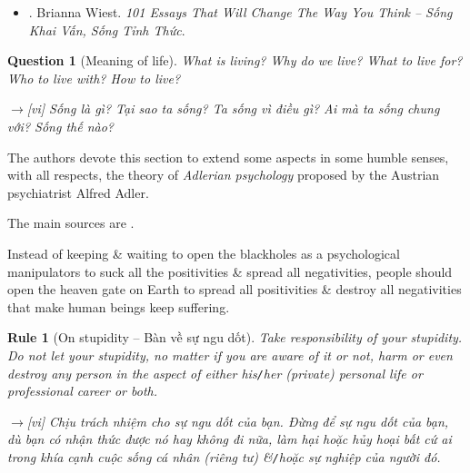 \documentclass[12pt,twoside]{book}
\newtheorem{question}{Question}
\newtheorem{Rule}{Rule}
\begin{document}
\begin{itemize}
\begin{itemize}
		{\sf[en]$\to$[vi]} Hoàn thành các mục tiêu không phải là thành công. Mà việc bạn mở rộng bao nhiêu trong quá trình này mới là thành công.
		
		\item {\it``Your habits create your mood, \& your mood is a filter through which you experience your life.''}
		
		{\sf[en]$\to$[vi]} Thói quen của bạn tạo ra tâm trạng của bạn, \& tâm trạng của bạn là một bộ lọc để bạn trải nghiệm cuộc sống của mình.
		
		\item {\it``You must learn to let your conscious decisions dictate your day -- not your fears or impulses.''}
		
		{\sf[en]$\to$[vi]} Bạn phải học cách để những quyết định có ý thức quyết định ngày của bạn -- chứ không phải nỗi sợ hãi hay sự bốc đồng của bạn
	\end{itemize}	
	Với bản dịch tiếng Việt:
	\item \cite{Wiest_101_essays_VN}. {\sc Brianna Wiest}. {\it 101 Essays That Will Change The Way You Think -- Sống Khai Vấn, Sống Tỉnh Thức}.
\end{itemize}

\begin{question}[Meaning of life]
	What is living? Why do we live? What to live for? Who to live with? How to live?
	
	{\sf[en]$\to$[vi]} Sống là gì? Tại sao ta sống? Ta sống vì điều gì? Ai mà ta sống chung với? Sống thế nào?
\end{question}
The authors devote this section to extend some aspects in some humble senses, with all respects, the theory of {\it Adlerian psychology} proposed by the Austrian psychiatrist {\sc Alfred Adler}.

The main sources are \cite{Adler_science_living}.

Instead of keeping \& waiting to open the blackholes as a psychological manipulators to suck all the positivities \& spread all negativities, people should open the heaven gate on Earth to spread all positivities \& destroy all negativities that make human beings keep suffering.

\begin{Rule}[On stupidity -- Bàn về sự ngu dốt]
	Take responsibility of your stupidity. Do not let your stupidity, no matter if you are aware of it or not, harm or even destroy any person in the aspect of either his{\tt/}her (private) personal life or professional career or both.
	
	{\sf[en]$\to$[vi]} Chịu trách nhiệm cho sự ngu dốt của bạn. Đừng để sự ngu dốt của bạn, dù bạn có nhận thức được nó hay không đi nữa, làm hại hoặc hủy hoại bất cứ ai trong khía cạnh cuộc sống cá nhân (riêng tư) \&{\tt/}hoặc sự nghiệp của người đó.
\end{Rule}
\end{document}
